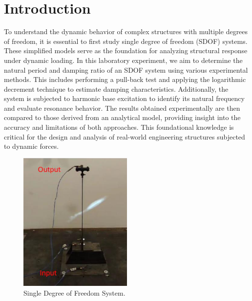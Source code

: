 \documentclass{article}  %
\begin{document}
\newpage
\thispagestyle{empty} %


\newpage
\setcounter{page}{1}

\section{Introduction}
To understand the dynamic behavior of complex structures with multiple degrees of freedom, it is essential to first study single degree of freedom (SDOF) systems. These simplified models serve as the foundation for analyzing structural response under dynamic loading. In this laboratory experiment, we aim to determine the natural period and damping ratio of an SDOF system using various experimental methods. This includes performing a pull-back test and applying the logarithmic decrement technique to estimate damping characteristics. Additionally, the system is subjected to harmonic base excitation to identify its natural frequency and evaluate resonance behavior. The results obtained experimentally are then compared to those derived from an analytical model, providing insight into the accuracy and limitations of both approaches. This foundational knowledge is critical for the design and analysis of real-world engineering structures subjected to dynamic forces.


\begin{figure}[h]
  \centering
  \includegraphics[width=0.5\textwidth]{GRAFICOS/SDOF_picture.PNG}
  \caption{Single Degree of Freedom System.}
  \label{fig:sdof}
\end{figure}
  
\end{document}
